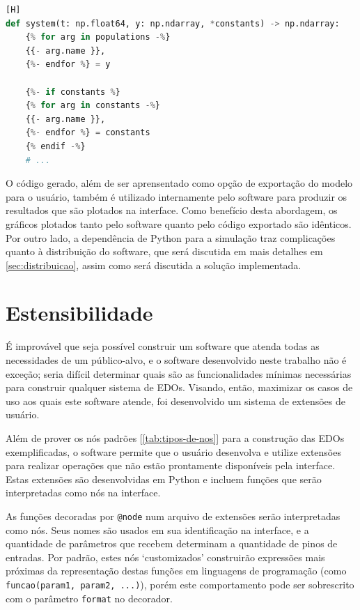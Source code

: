 \documentclass[
	12pt,				%
	openright,			%
	oneside,			%
	a4paper,			%
	main=brazil,
	english,			%
	]{ufsj-abntex2}
\begin{document}
\begin{lstlisting}[language=Python, label=code:jinja-template, caption=Trecho do \textit{template} responsável por extrair o valor de variáveis e constantes][H]
def system(t: np.float64, y: np.ndarray, *constants) -> np.ndarray:
    {% for arg in populations -%}
    {{- arg.name }},
    {%- endfor %} = y

    {%- if constants %}
    {% for arg in constants -%}
    {{- arg.name }},
    {%- endfor %} = constants
    {% endif -%}
    # ...
\end{lstlisting}

O código gerado, além de ser aprensentado como opção de exportação do modelo para o usuário, também é utilizado internamente pelo software para produzir os resultados que são plotados na interface. Como benefício desta abordagem, os gráficos plotados tanto pelo software quanto pelo código exportado são idênticos. Por outro lado, a dependência de Python para a simulação traz complicações quanto à distribuição do software, que será discutida em mais detalhes em \ref{sec:distribuicao}, assim como será discutida a solução implementada.

\section{Estensibilidade}
\label{sec:estensibilidade}

É improvável que seja possível construir um software que atenda todas as necessidades de um público-alvo, e o software desenvolvido neste trabalho não é exceção; seria difícil determinar quais são as funcionalidades mínimas necessárias para construir qualquer sistema de EDOs. Visando, então, maximizar os casos de uso aos quais este software atende, foi desenvolvido um sistema de extensões de usuário. 

Além de prover os nós padrões [\ref{tab:tipos-de-nos}] para a construção das EDOs exemplificadas, o software permite que o usuário desenvolva e utilize extensões para realizar operações que não estão prontamente disponíveis pela interface. Estas extensões são desenvolvidas em Python e incluem funções que serão interpretadas como nós na interface.

As funções decoradas por \texttt{@node} num arquivo de extensões serão interpretadas como nós. Seus nomes são usados em sua identificação na interface, e a quantidade de parâmetros que recebem determinam a quantidade de pinos de entradas. Por padrão, estes nós `customizados' construirão expressões mais próximas da representação destas funções em linguagens de programação (como \texttt{funcao(param1, param2, ...)}), porém este comportamento pode ser sobrescrito com o parâmetro \texttt{format} no decorador.
\end{document}
